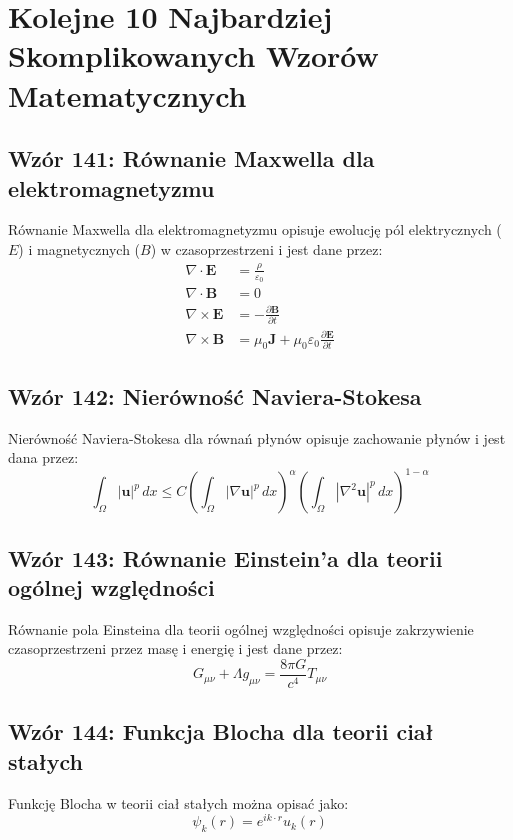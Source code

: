 \documentclass{article}
\begin{document}
\section*{Kolejne 10 Najbardziej Skomplikowanych Wzorów Matematycznych}

\subsection*{Wzór 141: Równanie Maxwella dla elektromagnetyzmu}

Równanie Maxwella dla elektromagnetyzmu opisuje ewolucję pól elektrycznych (\(E\)) i magnetycznych (\(B\)) w czasoprzestrzeni i jest dane przez:
\begin{align*}
  \nabla \cdot \mathbf{E} &= \frac{\rho}{\varepsilon_0} \\
  \nabla \cdot \mathbf{B} &= 0 \\
  \nabla \times \mathbf{E} &= -\frac{\partial \mathbf{B}}{\partial t} \\
  \nabla \times \mathbf{B} &= \mu_0\mathbf{J} + \mu_0\varepsilon_0\frac{\partial \mathbf{E}}{\partial t}
\end{align*}

\subsection*{Wzór 142: Nierówność Naviera-Stokesa}

Nierówność Naviera-Stokesa dla równań płynów opisuje zachowanie płynów i jest dana przez:
\[ \int_{\Omega} |\mathbf{u}|^p \, dx \leq C\left(\int_{\Omega} |\nabla \mathbf{u}|^p \, dx\right)^\alpha \left(\int_{\Omega} |\nabla^2 \mathbf{u}|^p \, dx\right)^{1-\alpha} \]

\subsection*{Wzór 143: Równanie Einstein'a dla teorii ogólnej względności}

Równanie pola Einsteina dla teorii ogólnej względności opisuje zakrzywienie czasoprzestrzeni przez masę i energię i jest dane przez:
\[ G_{\mu\nu} + \Lambda g_{\mu\nu} = \frac{8\pi G}{c^4} T_{\mu\nu} \]

\subsection*{Wzór 144: Funkcja Blocha dla teorii ciał stałych}

Funkcję Blocha w teorii ciał stałych można opisać jako:
\[ \psi_{k}(r) = e^{ik\cdot r}u_k(r) \]
\end{document}
